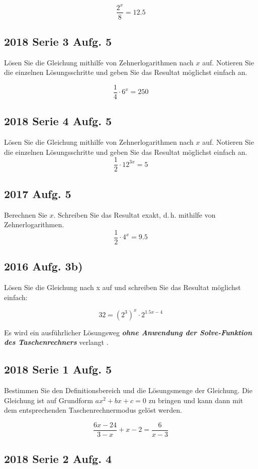 $$\frac{2^x}{8}= 12.5$$

\subsection{2018 Serie 3 Aufg. 5}
Lösen Sie die Gleichung mithilfe von Zehnerlogarithmen nach $x$ auf.
Notieren Sie die einzelnen Lösungsschritte und geben Sie das Resultat
möglichst einfach an.

$$\frac{1}{4}\cdot{} 6^x = 250$$


\subsection{2018 Serie 4 Aufg. 5}

Lösen Sie die Gleichung mithilfe von Zehnerlogarithmen nach $x$ auf.
Notieren Sie die einzelnen Lösungsschritte und geben Sie das Resultat
möglichst einfach an.
$$\frac{1}{2}\cdot{} 12^{3x}=5$$

\subsection{2017 Aufg. 5}
Berechnen Sie $x$. Schreiben Sie das Resultat exakt, d.\,h. mithilfe von Zehnerlogarithmen.
$$\frac{1}{2}\cdot{} 4^x = 9.5$$


\subsection{2016 Aufg. 3b)}
Lösen Sie die Gleichung nach x auf und schreiben Sie das Resultat
möglichst einfach:

$$32 = \left( 2^3 \right)^x  \cdot 2^{1.5x - 4}$$

Es wird ein ausführlicher Lösungsweg \textit{\textbf{ohne Anwendung der Solve-Funktion des
Taschenrechners}} verlangt .


\subsection{2018 Serie 1 Aufg. 5}
Bestimmen Sie den Definitionsbereich und die Lösungsmenge der Gleichung.
Die Gleichung ist auf Grundform $ax^2 + bx + c = 0$ zu bringen und
kann dann mit dem entsprechenden Taschenrechnermodus gelöst werden.

$$\frac{6x-24}{3-x}+x-2=\frac{6}{x-3}$$


\subsection{2018 Serie 2 Aufg. 4}

